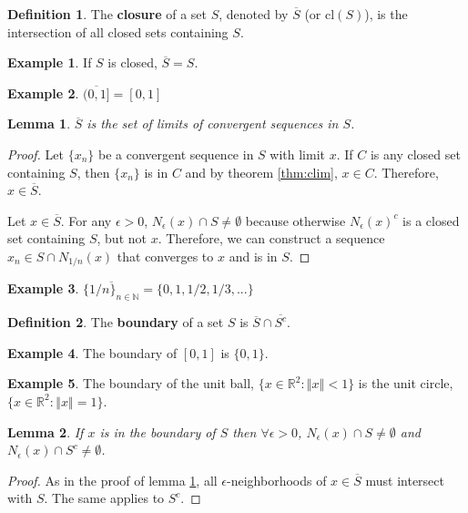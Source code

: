 \documentclass[12pt,reqno]{amsart}
\newtheorem{lemma}{Lemma}[section]
\theoremstyle{definition}
\newtheorem{definition}{Definition}[section]
\newtheorem{example}{Example}[section]
\def\R{\mathbb{R}}
\newcommand{\norm}[1]{\left\Vert {#1} \right\Vert}
\begin{document}
\begin{definition}
  The \textbf{closure} of a set $S$, denoted by $\overline{S}$ (or
  $\mathrm{cl}(S)$), is the intersection of all closed sets containing $S$.
\end{definition}

\begin{example}
  If $S$ is closed, $\overline{S} = S$. 
\end{example}
\begin{example}
  $\overline{(0,1]} = [0,1]$
\end{example}
\begin{lemma}\label{lem:closure}
  $\overline{S}$ is the set of limits of convergent sequences in $S$.
\end{lemma}
\begin{proof}
  Let $\{x_n\}$ be a convergent sequence in $S$ with limit $x$. If $C$
  is any closed set containing $S$, then $\{x_n\}$ is in $C$ and by
  theorem \ref{thm:clim}, $x \in C$. Therefore, $x \in \overline{S}$. 
  
  Let $x \in \overline{S}$. For any $\epsilon>0$, $N_\epsilon(x) \cap
  S \neq \emptyset$ because otherwise $N_\epsilon(x)^c$ is a closed
  set containing $S$, but not $x$. Therefore, we can construct a
  sequence $x_n \in S \cap N_{1/n}(x)$ that converges to $x$ and is in
  $S$. 
\end{proof}
\begin{example}
  $\overline{\{1/n\}_{n \in \mathbb{N}}} = \{0, 1, 1/2, 1/3, ... \}$
\end{example}
\begin{definition}
  The \textbf{boundary} of a set $S$ is $\overline{S} \cap
  \overline{S^c}$. 
\end{definition}
\begin{example}
  The boundary of $[0,1]$ is $\{0,1\}$.
\end{example}
\begin{example}
  The boundary of the unit ball, $\{x \in \R^2: \norm{x} < 1\}$ is the
  unit circle, $\{x \in \R^2: \norm{x} = 1\}$.
\end{example}
\begin{lemma}
  If $x$ is in the boundary of $S$ then $\forall \epsilon>0$,
  $N_\epsilon(x) \cap S \neq \emptyset$ and $N_\epsilon(x) \cap S^c
  \neq \emptyset$. 
\end{lemma}
\begin{proof}
  As in the proof of lemma \ref{lem:closure}, all
  $\epsilon$-neighborhoods of $x \in \overline{S}$ must intersect with
  $S$. The same applies to $S^c$. 
\end{proof}
\end{document}
